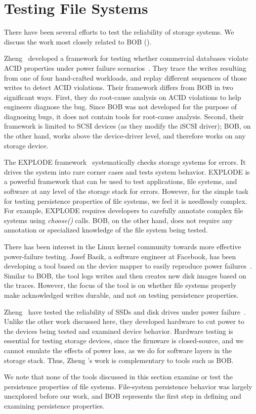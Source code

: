 \section{Testing File Systems}
\label{sec-related-test}

There have been several efforts to test the reliability of storage
systems. We discuss the work most closely related to BOB
().

Zheng \etal\ developed a framework for testing whether commercial
databases violate ACID properties under power failure
scenarios~\cite{ZhengEtAl14-Torturing}. They trace the writes resulting
from one of four hand-crafted workloads, and replay different
sequences of those writes to detect ACID violations. Their framework
differs from BOB in two significant ways. First, they do root-cause
analysis on ACID violations to help engineers diagnose the bug. Since
BOB was not developed for the purpose of diagnosing bugs, it does not
contain tools for root-cause analysis. Second, their framework is
limited to SCSI devices (as they modify the iSCSI driver); BOB, on the
other hand, works above the device-driver level, and therefore works
on any storage device.

The EXPLODE framework~\cite{YangEtAl06-Explode} systematically checks
storage systems for errors. It drives the system into rare corner
cases and tests system behavior. EXPLODE is a powerful framework that
can be used to test applications, file systems, and software at any
level of the storage stack for errors. However, for the simple task
for testing persistence properties of file systems, we feel it is
needlessly complex. For example, EXPLODE requires developers to
carefully annotate complex file systems using \textit{choose()} calls.
BOB, on the other hand, does not require any annotation or specialized
knowledge of the file system being tested.

There has been interest in the Linux kernel community towards more
effective power-failure testing. Josef Basik, a software engineer at
Facebook, has been developing a tool based on the device mapper to
easily reproduce power failures~\cite{Basik-power-patch,
  Basik-power-testing-lwn}. Similar to BOB, the tool logs writes and
then creates new disk images based on the traces. However, the focus
of the tool is on whether file systems properly make acknowledged
writes durable, and not on testing persistence properties.

Zheng \etal\ have tested the reliability of SSDs and disk drives under
power failure~\cite{ZhengEtAl+13-ssd}. Unlike the other work discussed
here, they developed hardware to cut power to the devices being tested
and examined device behavior. Hardware testing is essential for
testing storage devices, since the firmware is closed-source, and we
cannot emulate the effects of power loss, as we do for software layers
in the storage stack. Thus, Zheng \etal's work is complementary to
tools such as BOB.

We note that none of the tools discussed in this section examine or
test the persistence properties of file systems. File-system
persistence behavior was largely unexplored before our work, and BOB
represents the first step in defining and examining persistence
properties.  
